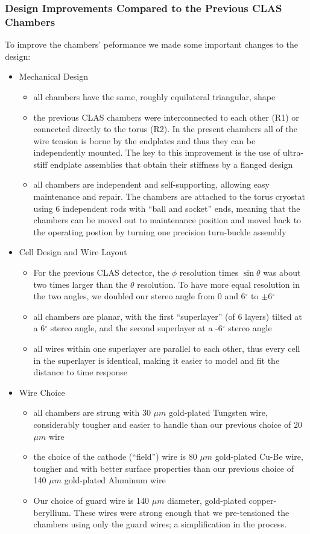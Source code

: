 \subsubsection{Design Improvements Compared to the Previous CLAS Chambers}
To improve the chambers' peformance we made some important changes to the design:
\begin{itemize}
\item Mechanical Design
\begin{itemize}
\item all chambers have the same, roughly equilateral triangular, shape
\item the previous CLAS chambers were interconnected to each other (R1) or 
connected directly to the torus (R2).  In the present chambers all of the wire tension
is borne by the endplates and thus they can be independently mounted.
The key to this improvement is the use of  
ultra-stiff endplate assemblies that obtain their stiffness 
by a flanged design
\item all chambers are independent and self-supporting, allowing easy
maintenance and repair.  The chambers are attached to the torus cryostat using 6 independent
rods with ``ball and socket'' ends, meaning that the chambers can be
moved out to maintenance position and moved back to the operating 
postion by turning one precision turn-buckle assembly
\end{itemize}
\item Cell Design and Wire Layout
\begin{itemize}  
\item For the previous CLAS detector, the $\phi$ resolution times $\sin \theta$ was about two 
times larger than the $\theta$ resolution.  To have more equal resolution in 
the two angles, we doubled our stereo angle from 0 and 6$^\circ$ to 
$\pm$6$^\circ$
\item all chambers are planar, with the first ``superlayer'' (of 6 layers)
tilted at a 6$^\circ$ stereo angle, and the second superlayer at a -6$^\circ$ stereo
angle
\item all wires within one superlayer are parallel to each other, thus
every cell in the superlayer is identical, making it easier to model
and fit the distance to time response
\end{itemize}
\item Wire Choice
\begin{itemize}
\item all chambers are strung with 30 $\mu m$ gold-plated Tungsten wire,
considerably tougher and easier to handle than our previous choice 
of 20 $\mu m$ wire
\item the choice of the cathode (``field'') wire is 80 $\mu m$ gold-plated
Cu-Be wire, tougher and with better surface properties than our previous
choice of 140 $\mu m$ gold-plated Aluminum wire
\item  Our choice of guard wire is 140 $\mu m$ diameter, gold-plated
copper-beryllium.  These wires were strong enough that we pre-tensioned 
the chambers using only the guard wires; a simplification in the process.
\end{itemize}
\end{itemize}




